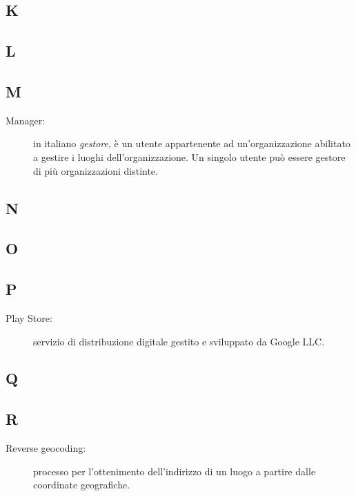 \documentclass[../manuale-utente.tex]{subfiles}
\begin{document}
\subsection{K}

\subsection{L}

\subsection{M}
\begin{description}
    \item[Manager:] in italiano \textit{gestore}, è un utente appartenente ad un'organizzazione abilitato a gestire i luoghi dell'organizzazione. Un singolo utente può essere gestore di più organizzazioni distinte.
\end{description}

\subsection{N}

\subsection{O}

\subsection{P}
\begin{description}
    \item[Play Store:] servizio di distribuzione digitale gestito e sviluppato da Google LLC\@.
\end{description}

\subsection{Q}

\subsection{R}
\begin{description}
    \item[Reverse geocoding:] processo per l'ottenimento dell'indirizzo di un luogo a partire dalle coordinate geografiche.
\end{description}
\end{document}
